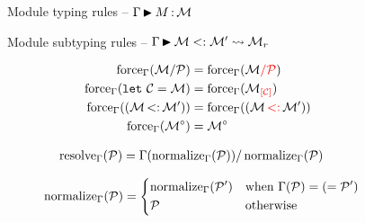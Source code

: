 \documentclass{article}
\theoremstyle{definition}
\begin{document}
\begin{figure}[!p]
  \vspace{-3mm}
  \caption{Module typing rules -- $\wtm{\E}{\im}{\iM}$}
  \label{module:typing}

  \vspace{-3mm}
  \caption{Module subtyping rules -- $\submod{\E}{\iM}{\iM'}{\iM_r}$}
  \label{module:subtyping}
\end{figure}

\begin{figure}[hbt]
  \vspace{-3mm}
  \caption{Lookup rules -- $\lookup{\E}{\ip} = \iM$}
  \label{module:lookup}

  \begin{subfigure}[t]{0.3\linewidth}
    \begin{align*}
      \Oforce{\E}{\Sstrengthen{l}{\iP}{\iM}}
      &= \Oforce{\E}{\Ostrengthen{l}{\iP}{\iM}}\\
      \Oforce{\E}{\Slet{\iC}{\iM}}
      &= \Oforce{\E}{\Oenrich{\iC}{\iM}}\\
      \Oforce{\E}{\Stransp{\iM}{\iM'}}
      &= \Oforce{\E}{\Otransp{\iM}{\iM'}}\\
      \Oforce{\E}{\iMO} &= \iMO
    \end{align*}
  \end{subfigure}
  \begin{subfigure}[t]{0.33\linewidth}
    \begin{align*}
      \resolve{\E}{\iP}
      &= \Sstrengthen{}{\Onormalize{\E}{\iP}}{\lookup{\E}{\Onormalize{\E}{\iP}}}
    \end{align*}
  \end{subfigure}
  \begin{subfigure}[t]{0.33\linewidth}
    \begin{align*}
      \Onormalize{\E}{\iP}
      &=
        \begin{dcases}
          \Onormalize{\E}{\iP'} & \text{when } \lookup{\E}{\iP} = \Salias{\iP'} \\
          \iP & \text{otherwise}
        \end{dcases}
    \end{align*}
  \end{subfigure}

\end{figure}
\end{document}
